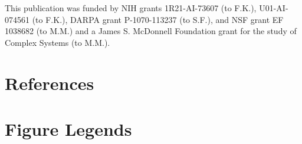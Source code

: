 \documentclass[preprint,10pt,authoryear]{elsarticle}
\begin{document}
This publication was funded by NIH grants 1R21-AI-73607 (to F.K.), U01-AI-074561 (to F.K.), DARPA grant P-1070-113237 (to S.F.), and NSF grant EF 1038682 (to M.M.) and a James S. McDonnell Foundation grant for the study of Complex Systems (to M.M.).




\section*{References}
\singlespacing


\pagebreak

\section*{Figure Legends}
\end{document}

